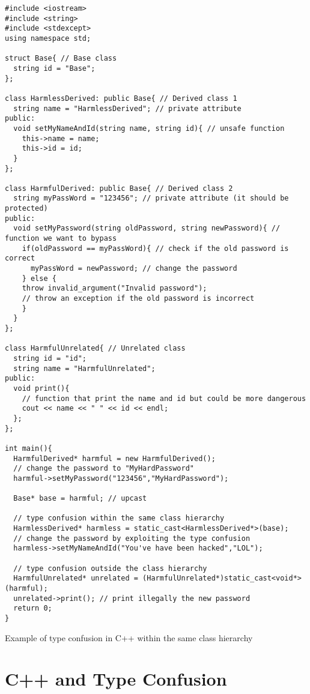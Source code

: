 \documentclass[a4paper,11pt,oneside]{report}
\begin{document}
\begin{listing}
       \begin{verbatim}
#include <iostream>
#include <string>
#include <stdexcept>
using namespace std;

struct Base{ // Base class
  string id = "Base";
};

class HarmlessDerived: public Base{ // Derived class 1
  string name = "HarmlessDerived"; // private attribute
public:
  void setMyNameAndId(string name, string id){ // unsafe function
    this->name = name; 
    this->id = id;
  }
};

class HarmfulDerived: public Base{ // Derived class 2
  string myPassWord = "123456"; // private attribute (it should be protected)
public:
  void setMyPassword(string oldPassword, string newPassword){ // function we want to bypass
    if(oldPassword == myPassWord){ // check if the old password is correct
      myPassWord = newPassword; // change the password
    } else {
    throw invalid_argument("Invalid password");  
    // throw an exception if the old password is incorrect
    }  
  }
};

class HarmfulUnrelated{ // Unrelated class
  string id = "id";
  string name = "HarmfulUnrelated";
public:
  void print(){ 
    // function that print the name and id but could be more dangerous
    cout << name << " " << id << endl;
  };
};

int main(){
  HarmfulDerived* harmful = new HarmfulDerived();
  // change the password to "MyHardPassword"
  harmful->setMyPassword("123456","MyHardPassword"); 

  Base* base = harmful; // upcast 

  // type confusion within the same class hierarchy
  HarmlessDerived* harmless = static_cast<HarmlessDerived*>(base); 
  // change the password by exploiting the type confusion 
  harmless->setMyNameAndId("You've have been hacked","LOL"); 

  // type confusion outside the class hierarchy
  HarmfulUnrelated* unrelated = (HarmfulUnrelated*)static_cast<void*>(harmful);
  unrelated->print(); // print illegally the new password
  return 0;    
}
       \end{verbatim}
       \caption{Example of type confusion in C++ within the same class hierarchy}
       \label{lst:type_confusion}
\end{listing}

\section{C++ and Type Confusion} \label{sec:cpp_type_confusion}
\end{document}
